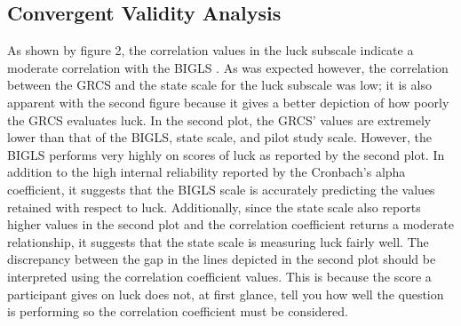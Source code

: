 \documentclass[twoside,twocolumn]{article}
\begin{document}
\subsection{Convergent Validity Analysis}
As shown by figure 2, the correlation values in the luck subscale indicate a moderate correlation with the BIGLS \cite{correlation}. As was expected however, the correlation between the GRCS and the state scale for the luck subscale was low; it is also apparent with the second figure because it gives a better depiction of how poorly the GRCS evaluates luck. In the second plot, the GRCS' values are extremely lower than that of the BIGLS, state scale, and pilot study scale. However, the BIGLS performs very highly on scores of luck as reported by the second plot. In addition to the high internal reliability reported by the Cronbach's alpha coefficient, it suggests that the BIGLS scale is accurately predicting the values retained with respect to luck. Additionally, since the state scale also reports higher values in the second plot and the correlation coefficient returns a moderate relationship, it suggests that the state scale is measuring luck fairly well. The discrepancy between the gap in the lines depicted in the second plot should be interpreted using the correlation coefficient values. This is because the score a participant gives on luck does not, at first glance, tell you how well the question is performing so the correlation coefficient must be considered.
\end{document}
